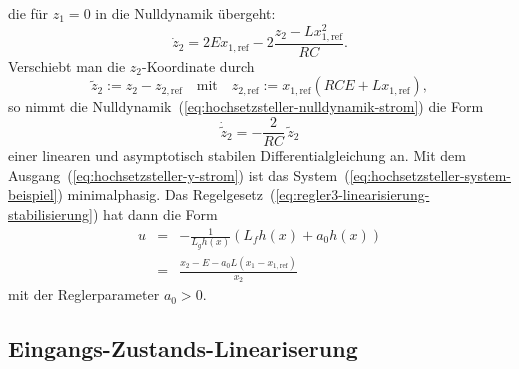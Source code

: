 die für $z_{1}=0$ in die Nulldynamik übergeht: 
\begin{equation}
\dot{z}_{2}=2Ex_{1,\text{ref}}-2\frac{z_{2}-Lx_{1,\text{ref}}^{2}}{RC}.\label{eq:hochsetzsteller-nulldynamik-strom}
\end{equation}
Verschiebt man die $z_{2}$-Koordinate durch 
\[
\tilde{z}_{2}:=z_{2}-z_{2,\text{ref}}\quad\text{mit}\quad z_{2,\text{ref}}:=x_{1,\text{ref}}\left(RCE+Lx_{1,\text{ref}}\right),
\]
so nimmt die Nulldynamik~(\ref{eq:hochsetzsteller-nulldynamik-strom})
die Form 
\begin{equation}
\dot{\tilde{z}}_{2}=-\frac{2}{RC}\,\tilde{z}_{2}\label{eq:hochsetzsteller-nulldynamik-strom-verschoben}
\end{equation}
einer linearen und asymptotisch stabilen Differentialgleichung an.
Mit dem Ausgang~(\ref{eq:hochsetzsteller-y-strom}) ist das System~(\ref{eq:hochsetzsteller-system-beispiel})
minimalphasig. Das Regelgesetz~(\ref{eq:regler3-linearisierung-stabilisierung})
hat dann die Form 
\begin{eqnarray}
u & = & -\frac{1}{L_{g}h(x)}\left(L_{f}h(x)+a_{0}h(x)\right)\nonumber \\
 & = & \frac{x_{2}-E-a_{0}L(x_{1}-x_{1,\text{ref}})}{x_{2}}\label{eq:hochsetzsteller-stromregelung}
\end{eqnarray}
mit der Reglerparameter $a_{0}>0$. 

\subsection{Eingangs-Zustands-Lineariserung\label{subsec:Hochsetzsteller-Ausgang-Energie}}

